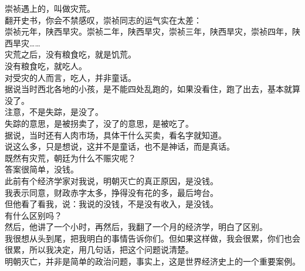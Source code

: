 \begin{multicols}{\theparacolNo}
崇祯遇上的，叫做灾荒。\\

翻开史书，你会不禁感叹，崇祯同志的运气实在太差：\\

崇祯元年，陕西旱灾。崇祯二年，陕西旱灾，崇祯三年，陕西旱灾，崇祯四年，陕西旱灾……\\

灾荒之后，没有粮食吃，就是饥荒。\\

没有粮食吃，就吃人。\\

对受灾的人而言，吃人，并非童话。\\

据说当时西北各地的小孩，是不能四处乱跑的，如果没看住，跑了出去，基本就算没了。\\

注意，不是失踪，是没了。\\

失踪的意思，是被拐卖了，没了的意思，是被吃了。\\

据说，当时还有人肉市场，具体干什么买卖，看名字就知道。\\

说这么多，只是想说，这并不是童话，也不是神话，而是真话。\\

既然有灾荒，朝廷为什么不赈灾呢？\\

答案很简单，没钱。\\

此前有个经济学家对我说，明朝灭亡的真正原因，是没钱。\\

我表示同意，财政赤字太多，挣得没有花的多，最后垮台。\\

但他看了看我，说：我说的没钱，不是没有收入，是没钱。\\

有什么区别吗？\\

然后，他讲了一个小时，再然后，我翻了一个月的经济学，明白了区别。\\

我很想从头到尾，把我明白的事情告诉你们。但如果这样做，我会很累，你们也会很累，所以我决定，用几句话，把这个问题说清楚。\\

明朝灭亡，并非是简单的政治问题，事实上，这是世界经济史上的一个重要案例。\\


\end{multicols}
